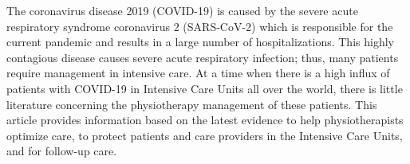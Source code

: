 The coronavirus disease 2019 (COVID-19) is caused by the severe acute respiratory syndrome coronavirus 2 (SARS-CoV-2) which is responsible for the current pandemic and results in a large number of hospitalizations. This highly contagious disease causes severe acute respiratory infection; thus, many patients require management in intensive care. At a time when there is a high influx of patients with COVID-19 in Intensive Care Units all over the world, there is little literature concerning the physiotherapy management of these patients. This article provides information based on the latest evidence to help physiotherapists optimize care, to protect patients and care providers in the Intensive Care Units, and for follow-up care.
